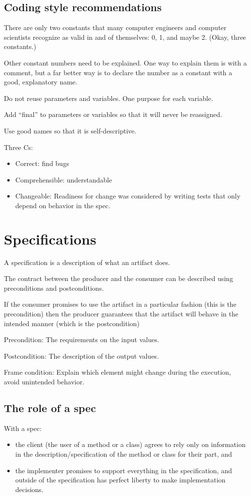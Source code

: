 \documentclass[letterpaper,12pt]{article}
\begin{document}
\subsection{Coding style recommendations}

There are only two constants that many computer engineers and computer
scientists recognize as valid in and of themselves: 0, 1, and maybe 2. (Okay,
three constants.)

Other constant numbers need to be explained. One way to explain them is with a
comment, but a far better way is to declare the number as a constant with a
good, explanatory name.

Do not reuse parameters and variables. One purpose for each variable.

Add ``final'' to parameters or variables so that it will never be reassigned.

Use good names so that it is self-descriptive.

Three Cs:
\begin{itemize}
      \item Correct: find bugs
      \item Comprehensible: understandable
      \item Changeable: Readiness for change was considered by writing tests that only
            depend on behavior in the spec.
\end{itemize}

\section{Specifications}
A specification is a description of what an artifact does.

The contract between the producer and the consumer can be described using
preconditions and postconditions.

If the consumer promises to use the artifact in a particular fashion (this is
the precondition) then the producer guarantees that the artifact will behave in
the intended manner (which is the postcondition)

Precondition: The requirements on the input values.

Postcondition: The description of the output values.

Frame condition: Explain which element might change during the execution, avoid
unintended behavior.
\subsection{The role of a spec}
With a spec:
\begin{itemize}
      \item the client (the user of a method or a class) agrees to rely only on information
            in the description/specification of the method or class for their part, and
      \item the implementer promises to support everything in the specification, and
            outside of the specification has perfect liberty to make implementation
            decisions.
\end{itemize}
\end{document}
